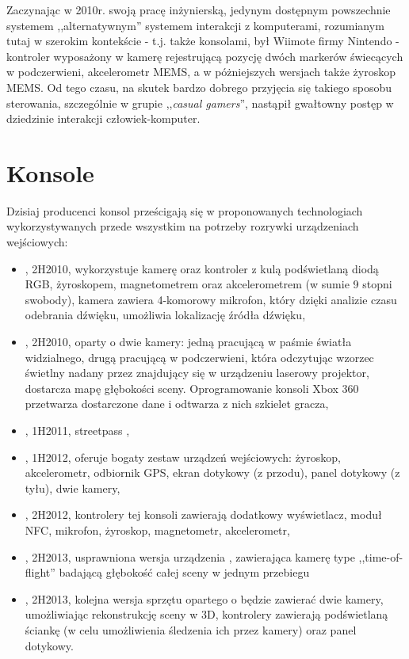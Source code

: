 \label{ch:current_state}

Zaczynając w 2010r. swoją pracę inżynierską, jedynym dostępnym powszechnie systemem ,,alternatywnym'' systemem interakcji z komputerami, rozumianym tutaj w szerokim kontekście - t.j. także konsolami, był Wiimote firmy Nintendo - kontroler wyposażony w kamerę rejestrującą pozycję dwóch markerów świecących w podczerwieni, akcelerometr MEMS, a w póżniejszych wersjach także żyroskop MEMS. Od tego czasu, na skutek bardzo dobrego przyjęcia się takiego sposobu sterowania, szczególnie w grupie ,,\textit{casual gamers}'', nastąpił gwałtowny postęp w dziedzinie interakcji człowiek-komputer.\\

\section{Konsole}

Dzisiaj producenci konsol prześcigają się w proponowanych technologiach wykorzystywanych przede wszystkim na potrzeby rozrywki urządzeniach wejściowych:
\begin{itemize}
 \item {}, 2H2010, wykorzystuje kamerę oraz kontroler z kulą podświetlaną diodą RGB, żyroskopem, magnetometrem oraz akcelerometrem (w sumie 9 stopni swobody), kamera zawiera 4-komorowy mikrofon, który dzięki analizie czasu odebrania dźwięku, umożliwia lokalizację źródła dźwięku,
 \item {}, 2H2010, oparty o dwie kamery: jedną pracującą w paśmie światła widzialnego, drugą pracującą w podczerwieni, która odczytując wzorzec świetlny nadany przez znajdujący się w urządzeniu laserowy projektor, dostarcza mapę głębokości sceny. Oprogramowanie konsoli Xbox 360 przetwarza dostarczone dane i odtwarza z nich szkielet gracza,
 \item {}, 1H2011, streetpass ,
 \item {}, 1H2012, oferuje bogaty zestaw urządzeń wejściowych: żyroskop, akcelerometr, odbiornik GPS, ekran dotykowy (z przodu), panel dotykowy (z tyłu), dwie kamery,
 \item {}, 2H2012, kontrolery tej konsoli zawierają dodatkowy wyświetlacz, moduł NFC, mikrofon, żyroskop, magnetometr, akcelerometr,
 \item {}, 2H2013, usprawniona wersja urządzenia , zawierająca kamerę type ,,time-of-flight'' badającą głębokość całej sceny w jednym przebiegu
 \item {}, 2H2013, kolejna wersja sprzętu opartego o  będzie zawierać dwie kamery, umożliwiając rekonstrukcję sceny w 3D, kontrolery zawierają  podświetlaną ściankę (w celu umożliwienia śledzenia ich przez kamery) oraz panel dotykowy.
\end{itemize}

